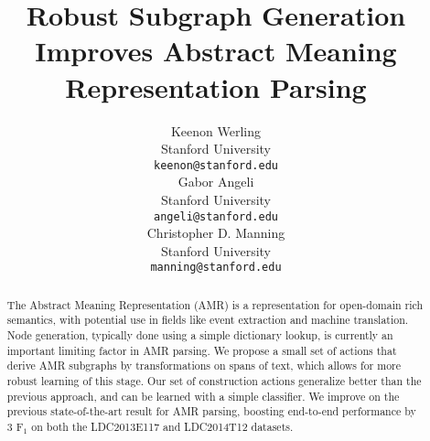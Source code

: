 \documentclass[11pt]{article}
\title{Robust Subgraph Generation Improves Abstract Meaning Representation Parsing}
\author{Keenon Werling \\
  Stanford University \\
  {\tt keenon@stanford.edu} \\\And
  Gabor Angeli \\
  Stanford University \\
  {\tt angeli@stanford.edu} \\\And
  Christopher D. Manning \\
  Stanford University \\
  {\tt manning@stanford.edu} \\}
\date{}
\begin{document}
\maketitle
\begin{abstract}


The Abstract Meaning Representation (AMR) is a representation for open-domain rich semantics, with potential use in fields like event extraction and machine translation. Node generation, typically done using a simple dictionary lookup, is currently an important limiting factor in AMR parsing. We propose a small set of actions that derive AMR subgraphs by transformations on spans of text, which allows for more robust learning of this stage. Our set of construction actions generalize better than the previous approach, and can be learned with a simple classifier. We improve on the previous state-of-the-art result for AMR parsing, boosting end-to-end performance by 3 F$_1$ on both the LDC2013E117 and LDC2014T12 datasets.


\end{abstract}
\end{document}
